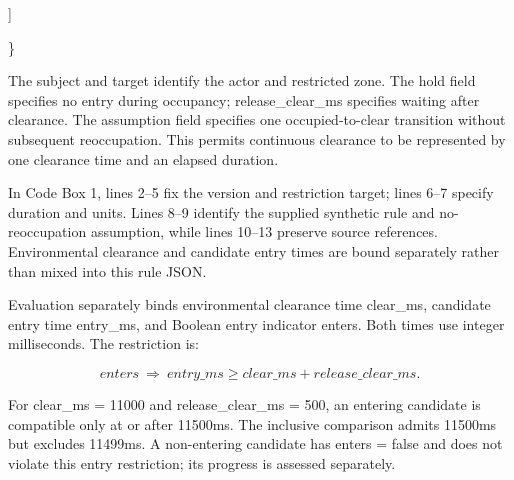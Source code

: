 \documentclass[11pt,a4paper]{article}
\begin{document}
\begin{minipage}{\linewidth}
{\begin{minipage}{\dimexpr\linewidth-2\fboxsep-2\fboxrule\relax}
\noindent{}\hspace{.8em}\parbox[t]{\dimexpr\linewidth-2.8em\relax}{\raggedright\ttfamily\fontsize{8.2}{10.5}\selectfont \hspace*{1.0em}]\strut}\par\vspace{1pt}
\noindent{}\hspace{.8em}\parbox[t]{\dimexpr\linewidth-2.8em\relax}{\raggedright\ttfamily\fontsize{8.2}{10.5}\selectfont \hspace*{0.0em}\}\strut}\par\vspace{1pt}
\end{minipage}}\par\medskip
\end{minipage}\par\medskip

The {\ttfamily\small subject} and {\ttfamily\small target} identify the actor and restricted zone. The {\ttfamily\small hold} field specifies no entry during occupancy; {\ttfamily\small release\_clear\_ms} specifies waiting after clearance. The {\ttfamily\small assumption} field specifies one occupied-to-clear transition without subsequent reoccupation. This permits continuous clearance to be represented by one clearance time and an elapsed duration.\par

In Code Box 1, lines 2–5 fix the version and restriction target; lines 6–7 specify duration and units. Lines 8–9 identify the supplied synthetic rule and no-reoccupation assumption, while lines 10–13 preserve source references. Environmental clearance and candidate entry times are bound separately rather than mixed into this rule JSON.\par

Evaluation separately binds environmental clearance time {\ttfamily\small clear\_ms}, candidate entry time {\ttfamily\small entry\_ms}, and Boolean entry indicator {\ttfamily\small enters}. Both times use integer milliseconds. The restriction is:\par

\[\mathit{enters}\ \Longrightarrow\ \mathit{entry\_ms}\geq\mathit{clear\_ms}+\mathit{release\_clear\_ms}.\]

For {\ttfamily\small clear\_ms = 11000} and {\ttfamily\small release\_clear\_ms = 500}, an entering candidate is compatible only at or after 11500ms. The inclusive comparison admits 11500ms but excludes 11499ms. A non-entering candidate has {\ttfamily\small enters = false} and does not violate this entry restriction; its progress is assessed separately.\par
\end{document}
